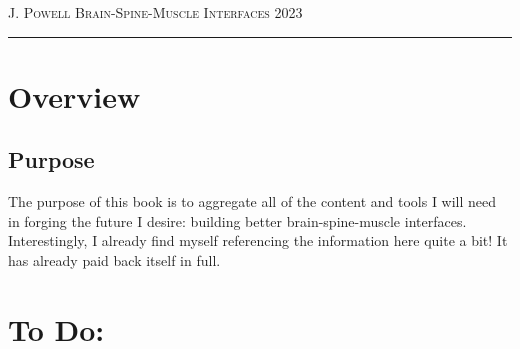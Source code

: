 \pagebreak




{\scshape J. Powell} \hfill {\scshape \large Brain-Spine-Muscle Interfaces} \hfill {\scshape 2023}
 
\smallskip

\hrule
\bigskip
\normalsize 



\section{Overview}

\subsection{Purpose}
The purpose of this book is to aggregate all of the content and tools I will need in forging the future I desire: building better brain-spine-muscle interfaces. Interestingly, I already find myself referencing the information here quite a bit! It has already paid back itself in full.



\section{To Do:}

